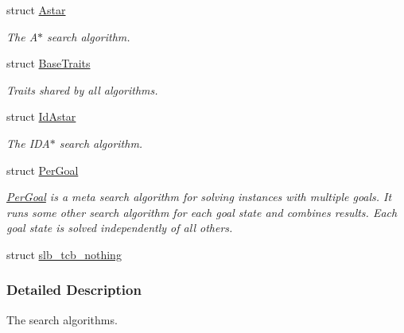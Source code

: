 \begin{DoxyCompactItemize}
struct \hyperlink{structslb_1_1ext_1_1algorithm_1_1Astar}{Astar}
\begin{DoxyCompactList}\small\item\em The {\ttfamily A$\ast$} search algorithm. \end{DoxyCompactList}\item 
struct \hyperlink{structslb_1_1ext_1_1algorithm_1_1BaseTraits}{Base\+Traits}
\begin{DoxyCompactList}\small\item\em Traits shared by all algorithms. \end{DoxyCompactList}\item 
struct \hyperlink{structslb_1_1ext_1_1algorithm_1_1IdAstar}{Id\+Astar}
\begin{DoxyCompactList}\small\item\em The {\ttfamily I\+D\+A$\ast$} search algorithm. \end{DoxyCompactList}\item 
struct \hyperlink{structslb_1_1ext_1_1algorithm_1_1PerGoal}{Per\+Goal}
\begin{DoxyCompactList}\small\item\em {\ttfamily \hyperlink{structslb_1_1ext_1_1algorithm_1_1PerGoal}{Per\+Goal}} is a meta search algorithm for solving instances with multiple goals. It runs some other search algorithm for each goal state and combines results. Each goal state is solved independently of all others. \end{DoxyCompactList}\item 
struct \hyperlink{structslb_1_1ext_1_1algorithm_1_1slb__tcb__nothing}{slb\+\_\+tcb\+\_\+nothing}
\end{DoxyCompactItemize}


\subsubsection{Detailed Description}
The search algorithms. 